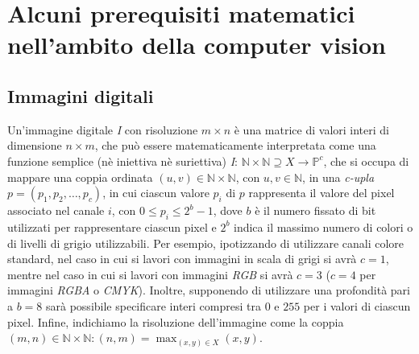 \chapter{Alcuni prerequisiti matematici nell'ambito della computer vision}
\label{chap:math-prerequisites}


\section{Immagini digitali}
\label{sec:math-images}
Un'immagine digitale \textit{I} con risoluzione $m\times n$ \`e una matrice di valori interi di dimensione $n\times m$, che pu\`o essere matematicamente interpretata come una funzione semplice (n\`e iniettiva n\`e suriettiva) \textit{I}: $\mathbb{N}\times\mathbb{N}\supseteq X \to \mathbb{P}^{c}$, che si occupa di mappare una coppia ordinata $(u,v)\in\mathbb{N}\times\mathbb{N}$, con $u,v\in\mathbb{N}$, in una \textit{c-upla} $p=(p_{1}, p_{2}, \dots, p_{c})$, in cui ciascun valore $p_{i}$ di $p$ rappresenta il valore del pixel associato nel canale ${i}$, con $0 \leq p_{i} \leq 2^{b} - 1$, dove $b$ \`e il numero fissato di bit utilizzati per rappresentare ciascun pixel e $2^{b}$ indica il massimo numero di colori o di livelli di grigio utilizzabili. Per esempio, ipotizzando di utilizzare canali colore standard, nel caso in cui si lavori con immagini in scala di grigi si avr\`a $c=1$, mentre nel caso in cui si lavori con immagini \textit{RGB} si avr\`a $c=3$ ($c=4$ per immagini \textit{RGBA} o \textit{CMYK}). Inoltre, supponendo di utilizzare una profondit\`a pari a $b=8$ sar\`a possibile specificare interi compresi tra $0$ e $255$ per i valori di ciascun pixel. Infine, indichiamo la risoluzione dell'immagine come la coppia $(m, n)\in\mathbb{N}\times\mathbb{N}\colon(n, m)=\max_{(x, y)\in X} (x,y)$.



